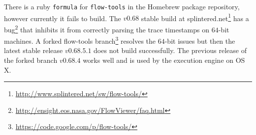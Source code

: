 There is a ruby \texttt{formula} for \texttt{flow-tools} in the Homebrew
package repository, however currently it fails to build. The $v0.68$ stable
build at
splintered.net\footnote{\url{http://www.splintered.net/sw/flow-tools/}} has a
bug\footnote{\url{http://ensight.eos.nasa.gov/FlowViewer/faq.html}} that
inhibits it from correctly parsing the trace timestamps  on $64$-bit machines. A forked flow-tools
branch\footnote{\url{https://code.google.com/p/flow-tools/}} resolves the
$64$-bit issues but then the latest stable release $v0.68.5.1$ does not build
successfully. The previous release of the forked branch $v0.68.4$ works well
and is used by the execution engine on OS X.

